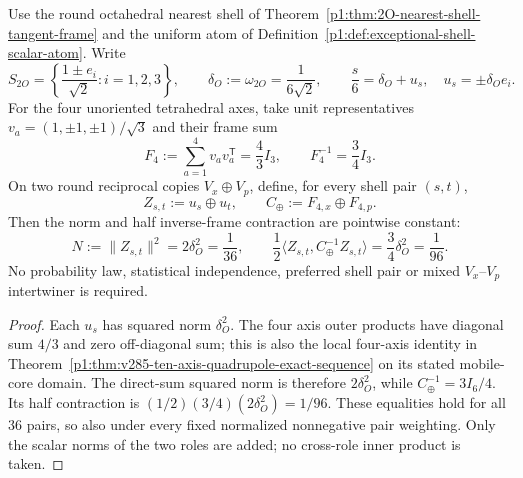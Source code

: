 \documentclass[11pt,a4paper]{article}
\begin{document}
\begin{proposition}
\label{p3g:prop:v252-pointwise-shell-frame}
Use the round octahedral nearest shell of
Theorem~\ref{p1:thm:2O-nearest-shell-tangent-frame} and the uniform atom of
Definition~\ref{p1:def:exceptional-shell-scalar-atom}. Write
\[
 S_{2O}=\left\{\frac{1\pm e_i}{\sqrt2}:i=1,2,3\right\},\qquad
 \delta_O:=\omega_{2O}=\frac1{6\sqrt2},\qquad
 \frac{s}{6}=\delta_O+u_s,\quad u_s=\pm\delta_Oe_i.
\]
For the four unoriented tetrahedral axes, take unit representatives
\(v_a=(1,\pm1,\pm1)/\sqrt3\) and their frame sum
\begin{equation}
\label{p3g:eq:v252-four-axis-frame}
 F_4:=\sum_{a=1}^4v_av_a^{\mathsf T}=\frac43I_3,
 \qquad F_4^{-1}=\frac34I_3.
\end{equation}
On two round reciprocal copies \(V_x\oplus V_p\), define, for every shell
pair \((s,t)\),
\[
 Z_{s,t}:=u_s\oplus u_t,\qquad
 C_\oplus:=F_{4,x}\oplus F_{4,p}.
\]
Then the norm and half inverse-frame contraction are pointwise constant:
\begin{equation}
\label{p3g:eq:v252-pointwise-96}
 \boxed{N:=\|Z_{s,t}\|^2=2\delta_O^2=\frac1{36},\qquad
 \frac12\langle Z_{s,t},C_\oplus^{-1}Z_{s,t}\rangle
       =\frac34\delta_O^2=\frac1{96}.}
\end{equation}
No probability law, statistical independence, preferred shell pair or mixed
\(V_x\)--\(V_p\) intertwiner is required.
\end{proposition}
\begin{proof}
Each \(u_s\) has squared norm \(\delta_O^2\). The four axis outer products
have diagonal sum \(4/3\) and zero off-diagonal sum; this is also the local
four-axis identity in
Theorem~\ref{p1:thm:v285-ten-axis-quadrupole-exact-sequence} on its stated
mobile-core domain. The direct-sum squared norm is therefore
\(2\delta_O^2\), while \(C_\oplus^{-1}=3I_6/4\). Its half contraction is
\((1/2)(3/4)(2\delta_O^2)=1/96\). These equalities hold for all 36 pairs,
so also under every fixed normalized nonnegative pair weighting. Only the scalar norms of the
two roles are added; no cross-role inner product is taken.
\end{proof}
\end{document}
